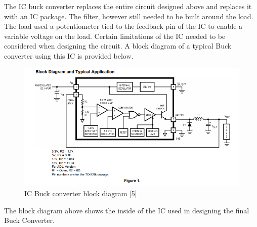 
	
	The IC buck converter replaces the entire circuit designed above and replaces it with an IC package. The filter, however still needed to be built around the load. The load used a potentiometer tied to the feedback pin of the IC to enable a variable voltage on the load. Certain limitations of the IC needed to be considered when designing the circuit. A block diagram of a typical Buck converter using this IC is provided below. 
	
	\begin{figure}[H]
		\centering
		\includegraphics[width=.6\textwidth]{CircuitDevelopment/ICblock.png}
		\caption{IC Buck converter block diagram [5]}
		\label{fig:icblock}
	\end{figure}
	
	The block diagram above shows the inside of the IC used in designing the final Buck Converter.
	
	
	
	
	
